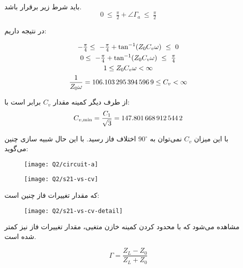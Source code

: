 \documentclass[12pt,onecolumn,a4paper]{article}
\begin{document}
باید شرط زیر برقرار باشد.
\begin{equation}
	0\ \le \ \tfrac{\pi}{2} + \angle \Gamma_a\ \le\  \tfrac{\pi}{2}
\end{equation}

در نتیجه داریم:

\begin{gather}
	-\tfrac{\pi}{4} \le\ -\tfrac{\pi}{4} + \tan^{-1}(Z_0 C_v \omega) \  \le\ 0  \\
	0 \le\ -\tfrac{\pi}{4} + \tan^{-1}(Z_0 C_v \omega) \  \le\  \tfrac\pi4 \\
	1 \le  Z_0 C_v \omega < \infty \\
	\frac{1}{Z_0 \omega}=\num{\fpeval{1/(2*pi*\fo*50)*1e15}} \le   C_v  < \infty \\
\end{gather}

از طرف دیگر کمینه مقدار $C_v$ برابر است با:
\begin{equation}
	C_{v, \min} = \frac{C_1}{\sqrt3} = \num{\fpeval{\Cl/sqrt(3)*1e15}}
\end{equation}


با این میزان $C_v$ نمی‌توان به $90^\circ$ اختلاف فاز رسید. با این حال شبیه سازی چنین می‌گوید:

\begin{figure}
	\centering
	\texttt{[image: Q2/circuit-a]}
	\caption{}
	\label{fig:circuit-a}
\end{figure}


\begin{figure}[H]
	\centering
	\texttt{[image: Q2/s21-vs-cv]}
	\caption{}
	\label{fig:s21-vs-cv}
\end{figure}

که مقدار تغییرات فاز چنین است:


\begin{figure}[H]
	\centering
	\texttt{[image: Q2/s21-vs-cv-detail]}
	\caption{}
	\label{fig:s21-vs-cv-detail}
\end{figure}

مشاهده می‌شود که با محدود کردن کمینه خازن متغیی، مقدار تغییرات فاز نیز کمتر شده است.



\begin{equation}
	\Gamma = \frac{Z_L - Z_0}{Z_L + Z_0}
\end{equation}
\end{document}
